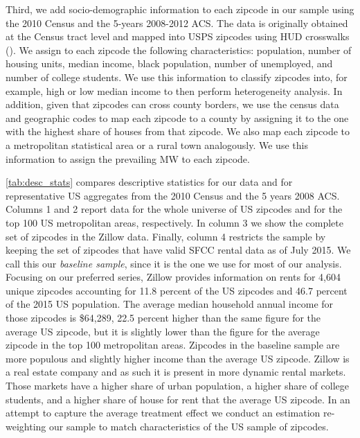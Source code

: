 Third, we add socio-demographic information to each zipcode in our sample using the 2010 Census 
and the 5-years 2008-2012 ACS. The data is originally obtained at the Census tract level and mapped 
into USPS zipcodes using HUD crosswalks (\citeyear{hud}).
We assign to each zipcode the following characteristics: population, number of housing units, 
median income, black population, number of unemployed, and number of college students. We use 
this information to classify zipcodes into, for example, high or low median income to then perform 
heterogeneity analysis. In addition, given that zipcodes can cross county borders, we use the 
census data and geographic codes to map each zipcode to a county by assigning it to the one 
with the highest share of houses from that zipcode. We also map each zipcode to a metropolitan 
statistical area or a rural town analogously. We use this information to assign the prevailing 
MW to each zipcode.

\autoref{tab:desc_stats} compares descriptive statistics for our data and for representative 
US aggregates from the 2010 Census and the 5 years 2008 ACS. Columns 1 and 2 report data for the 
whole universe of US zipcodes and for the top 100 US metropolitan areas, respectively. In column 3 
we show the complete set of zipcodes in the Zillow data. Finally, column 4 restricts the sample by 
keeping the set of zipcodes that have valid SFCC rental data as of July 2015. We call this
our \textit{baseline sample}, since it is the one we use for most of our analysis. Focusing on our 
preferred series, Zillow provides information on rents for 4,604 unique zipcodes accounting for 
11.8 percent of the US zipcodes and 46.7 percent of the 2015 US population. The average median 
household annual income for those zipcodes is \$64,289, 22.5 percent higher than the same figure 
for the average US zipcode, but it is slightly lower than the figure for the average zipcode 
in the top 100 metropolitan areas. Zipcodes in the baseline sample are more populous and slightly 
higher income than the average US zipcode. Zillow is a real estate company and as such it is 
present in more dynamic rental markets. Those markets have a higher share of urban population, 
a higher share of college students, and a higher share of house for rent that the average US 
zipcode. In an attempt to capture the average treatment effect we conduct an estimation 
re-weighting our sample to match characteristics of the US sample of zipcodes.

